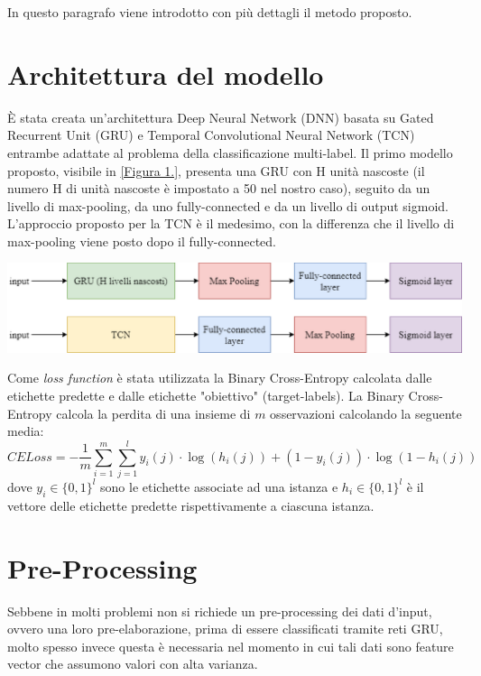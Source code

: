In questo paragrafo viene introdotto con più dettagli il metodo proposto.
\section{Architettura del modello}
È stata creata un'architettura Deep Neural Network (DNN) basata su Gated Recurrent Unit (GRU) e Temporal Convolutional Neural Network (TCN) entrambe adattate al problema della classificazione multi-label. Il primo modello proposto, visibile in \ref{Figura 1.}, presenta una GRU con H unità nascoste (il numero H di unità nascoste è impostato a 50 nel nostro caso), seguito da un livello di max-pooling, da uno fully-connected e da un livello di output  sigmoid. L'approccio proposto per la TCN è il medesimo, con la differenza che il livello di max-pooling viene posto dopo il fully-connected.
\vspace{0.25cm} 
\begin{center}
	\includegraphics[scale=0.55]{images/arch.eps} %
	\label{appr:dnn}
\end{center}
\vspace{0.25cm}
Come \textit{loss function} è stata utilizzata la Binary Cross-Entropy calcolata dalle etichette predette e dalle etichette "obiettivo" (target-labels). La Binary Cross-Entropy calcola la perdita di una insieme di $ m $ osservazioni calcolando la seguente media:
\begin{equation}
	CELoss = -\frac{1}{m}\sum_{i=1}^{m}\sum_{j=1}^{l}y_{i}(j)\cdot\log(h_{i}(j))+(1-y_{i}(j))\cdot\log(1-h_{i}(j)) 
\end{equation}
dove $y_{i} \in \{0,1\}^l$ sono le etichette associate ad una istanza e $h_{i} \in \{0,1\}^l$  è il vettore delle etichette predette rispettivamente a ciascuna istanza.

\section{Pre-Processing}
Sebbene in molti problemi non si richiede un pre-processing dei dati d'input, ovvero una loro pre-elaborazione, prima di essere classificati tramite reti GRU, molto spesso invece questa è necessaria nel momento in cui tali dati sono feature vector che assumono valori con alta varianza. 

